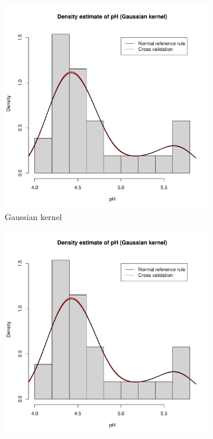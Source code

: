 \documentclass[10pt]{article}
\begin{document}
    \begin{figure}[H]
         \centering
         \begin{subfigure}[b]{0.45\textwidth}
             \centering
             \includegraphics[width=\textwidth, page = 1]{acid-rain.pdf}
             \caption{Gaussian kernel}
         \end{subfigure}
         \hfill
         \begin{subfigure}[b]{0.45\textwidth}
             \centering
             \includegraphics[width=\textwidth, page = 2]{acid-rain.pdf}

\end{subfigure}
\end{figure}
\end{document}
